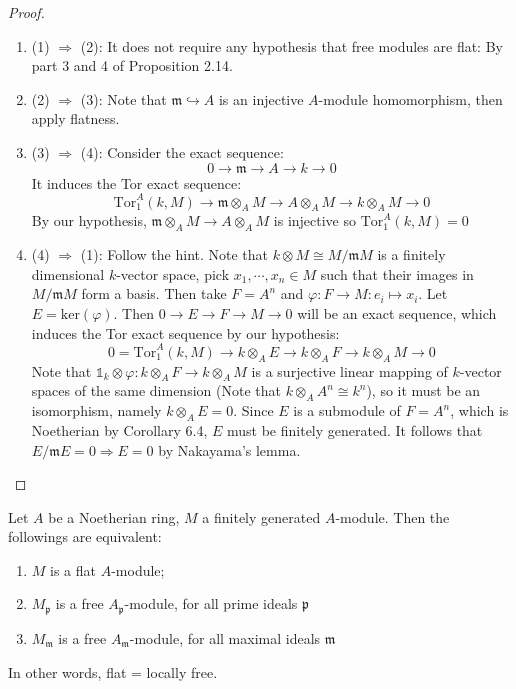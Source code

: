 \documentclass{solution}
\begin{document}
\begin{proof}
    \begin{enumerate}
        \item (1) $\Rightarrow$ (2): It does not require any hypothesis that free modules are flat: By part 3 and 4 of Proposition 2.14.
        \item (2) $\Rightarrow$ (3): Note that $\mathfrak{m} \hookrightarrow A$ is an injective $A$-module homomorphism, then apply flatness.
        \item (3) $\Rightarrow$ (4): Consider the exact sequence:
        $$0 \rightarrow \mathfrak{m} \rightarrow A \rightarrow k \rightarrow 0$$
        It induces the Tor exact sequence:
        $$\mathrm{Tor}_{1}^{A}(k, M) \rightarrow \mathfrak{m} \otimes_A M \rightarrow A \otimes_A M \rightarrow k \otimes_A M \rightarrow 0$$
        By our hypothesis, $\mathfrak{m} \otimes_A M \rightarrow A \otimes_A M$ is injective so $\mathrm{Tor}_{1}^{A}(k, M) = 0$
        \item (4) $\Rightarrow$ (1): Follow the hint. Note that $k \otimes M \cong M / \mathfrak{m} M$ is a finitely dimensional $k$-vector space, pick $x_1, \cdots, x_n \in M$ such that their images in $M / \mathfrak{m} M$ form a basis. Then take $F = A^n$ and $\varphi: F \rightarrow M: e_i \mapsto x_i$. Let $E = \mathrm{ker}(\varphi)$. Then $0 \rightarrow E \rightarrow F \rightarrow M \rightarrow 0$ will be an exact sequence, which induces the Tor exact sequence by our hypothesis:
        $$0 = \mathrm{Tor}_{1}^{A}(k, M) \rightarrow k \otimes_A E \rightarrow k \otimes_A F \rightarrow k \otimes_A M \rightarrow 0$$
        Note that $\mathds{1}_k \otimes \varphi: k \otimes_A F \rightarrow k \otimes_A M$ is a surjective linear mapping of $k$-vector spaces of the same dimension (Note that $k \otimes_A A^n \cong k^n$), so it must be an isomorphism, namely $k \otimes_A E = 0$. Since $E$ is a submodule of $F = A^n$, which is Noetherian by Corollary 6.4, $E$ must be finitely generated. It follows that $E / \mathfrak{m}E = 0 \Rightarrow E = 0$ by Nakayama's lemma.
    \end{enumerate}
\end{proof}

\begin{problem}
    Let $A$ be a Noetherian ring, $M$ a finitely generated $A$-module. Then the followings are equivalent:
    \begin{enumerate}
        \item $M$ is a flat $A$-module;
        \item $M_{\mathfrak{p}}$ is a free $A_{\mathfrak{p}}$-module, for all prime ideals $\mathfrak{p}$
        \item $M_{\mathfrak{m}}$ is a free $A_{\mathfrak{m}}$-module, for all maximal ideals $\mathfrak{m}$
    \end{enumerate}
    In other words, flat = locally free.
\end{problem}
\end{document}

